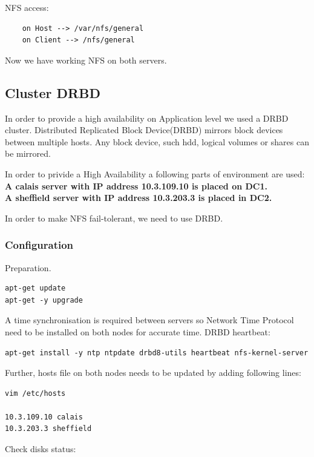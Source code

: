 \documentclass[10pt,a4paper]{article}
\begin{document}
NFS access:

\begin{verbatim}
    on Host --> /var/nfs/general
    on Client --> /nfs/general
\end{verbatim}


Now we have working NFS on both servers.


\subsection{Cluster DRBD}
In order to provide a high availability on Application level we used a DRBD cluster. Distributed Replicated Block Device(DRBD) mirrors block devices between multiple hosts. Any block device, such hdd, logical volumes or shares can be mirrored.

In order to privide a High Availability a following parts of environment are used:\\
\textbf{A calais server with IP address 10.3.109.10 is placed on DC1.}\\
\textbf{A sheffield server with IP address 10.3.203.3 is placed in DC2.}

In order to make NFS fail-tolerant, we need to use DRBD. 

\subsubsection{Configuration}
Preparation.
\begin{verbatim}
apt-get update
apt-get -y upgrade
\end{verbatim}

A time synchronisation is required between servers so Network Time Protocol need to be installed on both nodes for accurate time. DRBD heartbeat:
\begin{verbatim}
apt-get install -y ntp ntpdate drbd8-utils heartbeat nfs-kernel-server
\end{verbatim}

Further, hosts file on both nodes needs to be updated by adding following lines:
\begin{verbatim}
vim /etc/hosts

10.3.109.10 calais
10.3.203.3 sheffield
\end{verbatim}

Check disks status:
\end{document}

